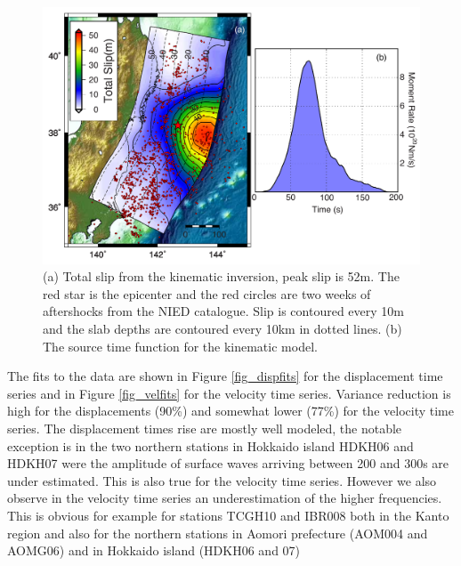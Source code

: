\begin{figure}[!ht] 
  \centering
  \includegraphics[width=0.99\linewidth]{./figures/ch4/total_slip_moment_rate.pdf}
    \caption[Kinematic inversion results]{(a) Total slip from the kinematic inversion, peak slip is 52m. The red star is the epicenter and the red circles are two weeks of aftershocks from the NIED catalogue. Slip is contoured every 10m and the slab depths are contoured every 10km in dotted lines. (b) The source time function for the kinematic model. }
  \label{fig_totalslip}
\end{figure}

The fits to the data are shown in Figure \ref{fig_dispfits} for the displacement time series and in Figure \ref{fig_velfits} for the velocity time series. Variance reduction is high for the displacements (90\%) and somewhat lower (77\%) for the velocity time series.  The displacement times rise are mostly well modeled, the notable exception is in the two northern stations in Hokkaido island HDKH06 and HDKH07 were the amplitude of surface waves arriving between 200 and 300s are under estimated. This is also true for the velocity time series. However we also observe in the velocity time series an underestimation of the higher frequencies. This is obvious for example for stations TCGH10 and IBR008 both in the Kanto region and also for the northern stations in Aomori prefecture (AOM004 and AOMG06) and in Hokkaido island (HDKH06 and 07)

